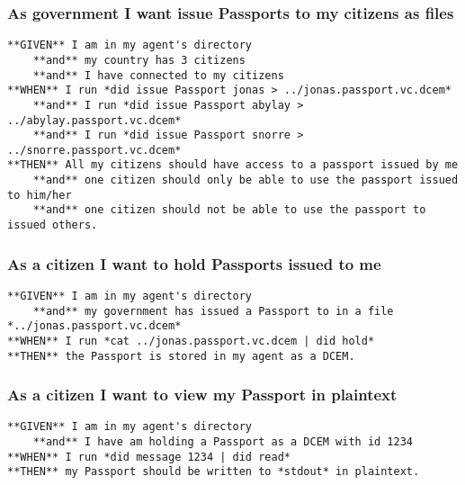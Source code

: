 \hypertarget{as-government-i-want-issue-passports-to-my-citizens-as-files}{%
\subsubsection{As government I want issue Passports to my citizens as
files}\label{as-government-i-want-issue-passports-to-my-citizens-as-files}}

\begin{lstlisting}
**GIVEN** I am in my agent's directory
    **and** my country has 3 citizens
    **and** I have connected to my citizens
**WHEN** I run *did issue Passport jonas > ../jonas.passport.vc.dcem*
    **and** I run *did issue Passport abylay > ../abylay.passport.vc.dcem*
    **and** I run *did issue Passport snorre > ../snorre.passport.vc.dcem*
**THEN** All my citizens should have access to a passport issued by me
    **and** one citizen should only be able to use the passport issued to him/her
    **and** one citizen should not be able to use the passport to issued others.
\end{lstlisting}

\hypertarget{as-a-citizen-i-want-to-hold-passports-issued-to-me}{%
\subsubsection{As a citizen I want to hold Passports issued to
me}\label{as-a-citizen-i-want-to-hold-passports-issued-to-me}}

\begin{lstlisting}
**GIVEN** I am in my agent's directory
    **and** my government has issued a Passport to in a file *../jonas.passport.vc.dcem*
**WHEN** I run *cat ../jonas.passport.vc.dcem | did hold*
**THEN** the Passport is stored in my agent as a DCEM.
\end{lstlisting}

\hypertarget{as-a-citizen-i-want-to-view-my-passport-in-plaintext}{%
\subsubsection{As a citizen I want to view my Passport in
plaintext}\label{as-a-citizen-i-want-to-view-my-passport-in-plaintext}}

\begin{lstlisting}
**GIVEN** I am in my agent's directory
    **and** I have am holding a Passport as a DCEM with id 1234
**WHEN** I run *did message 1234 | did read*
**THEN** my Passport should be written to *stdout* in plaintext.
\end{lstlisting}

